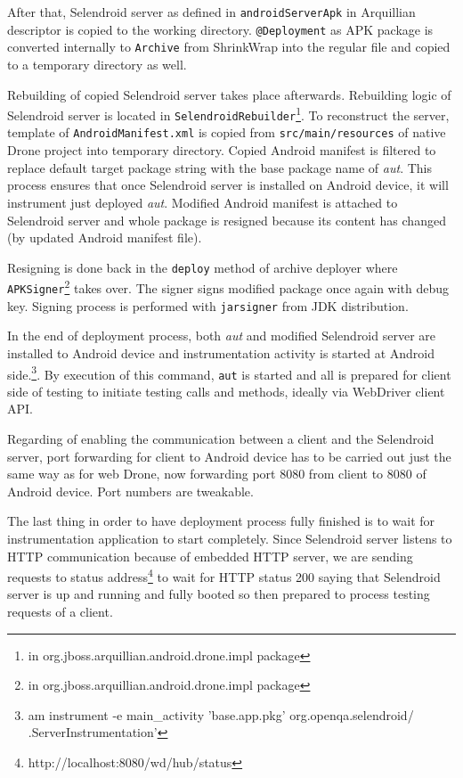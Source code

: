 \documentclass[12pt,final,oneside]{fithesis}
\begin{document}
After that, Selendroid server as defined in \texttt{androidServerApk} in Arquillian descriptor is copied to the working directory. \texttt{@Deployment} as APK package is converted internally to \texttt{Archive} from ShrinkWrap into the regular file and copied to a temporary directory as well.

Rebuilding of copied Selendroid server takes place afterwards. Rebuilding logic of Selendroid server is located in \texttt{SelendroidRebuilder}\footnote{in org.jboss.arquillian.android.drone.impl package}. To reconstruct the server, template of \texttt{AndroidManifest.xml} is copied from \texttt{src/main/resources} of native Drone project into temporary directory. Copied Android manifest is filtered to replace default target package string with the base package name of \textit{aut}. This process ensures that once Selendroid server is installed on Android device, it will instrument just deployed \textit{aut}. Modified Android manifest is attached to Selendroid server and whole package is resigned because its content has changed (by updated Android manifest file).

Resigning is done back in the \texttt{deploy} method of archive deployer where \texttt{APKSigner}\footnote{in org.jboss.arquillian.android.drone.impl package} takes over. The signer signs modified package once again with debug key. Signing process is performed with \texttt{jarsigner} from JDK distribution.

In the end of deployment process, both \textit{aut} and modified Selendroid server are installed to Android device and instrumentation activity is started at Android side.\footnote{am instrument -e main\_activity 'base.app.pkg' org.openqa.selendroid/ .ServerInstrumentation'}. By execution of this command, \texttt{aut} is started and all is prepared for client side of testing to initiate testing calls and methods, ideally via WebDriver client API. 

Regarding of enabling the communication between a client and the Selendroid server, port forwarding for client to Android device has to be carried out just the same way as for web Drone, now forwarding port 8080 from client to 8080 of Android device. Port numbers are tweakable.

The last thing in order to have deployment process fully finished is to wait for instrumentation application to start completely. Since Selendroid server listens to HTTP communication because of embedded HTTP server, we are sending requests to status address\footnote{http://localhost:8080/wd/hub/status} to wait for HTTP status 200 saying that Selendroid server is up and running and fully booted so then prepared to process testing requests of a client.
\end{document}
